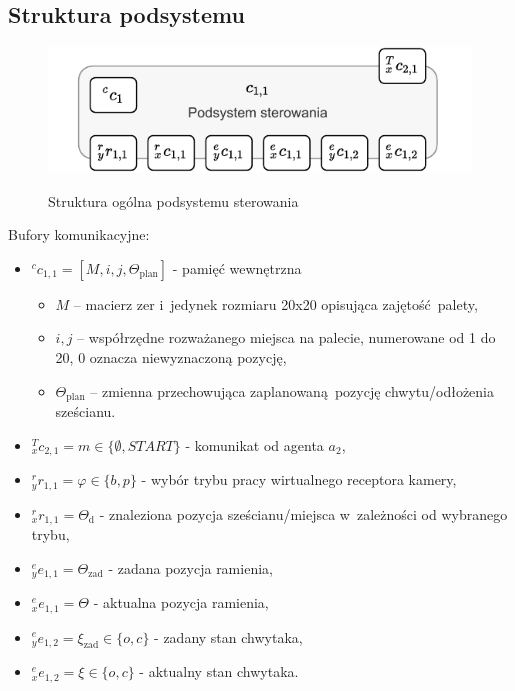 \subsection{Struktura podsystemu}
\label{subsec:cs-struktura}

\begin{figure}[H]
    \centering
    \includegraphics[width=\columnwidth]{figures/ISR-cs-model.pdf}
    \label{fig:model-cs}
    \caption{Struktura ogólna podsystemu sterowania}
\end{figure}

Bufory komunikacyjne:
\begin{itemize}
    \item ${}^{c}c_{1,1} = [M, i, j, \Theta_{\mathrm{plan}}]$ - pamięć wewnętrzna \begin{itemize}
        \item $M$ -- macierz zer i~jedynek rozmiaru 20x20 opisująca zajętość palety,
        \item $i,j$ -- współrzędne rozważanego miejsca na palecie, numerowane od 1 do 20, 0 oznacza niewyznaczoną pozycję,
        \item $\Theta_{\mathrm{plan}}$ -- zmienna przechowująca zaplanowaną pozycję chwytu/odłożenia sześcianu.
    \end{itemize}
    
    \item ${}^{T}_{x}c_{2,1} = m \in \{ \emptyset, START \}$ - komunikat od agenta $a_{2}$,
    
    \item ${}^{r}_{y}r_{1,1} = \varphi \in \{b, p\}$ - wybór trybu pracy wirtualnego receptora kamery,
    \item ${}^{r}_{x}r_{1,1} = \Theta_{\mathrm{d}}$ - znaleziona pozycja sześcianu/miejsca w~zależności od wybranego trybu,

    \item ${}^{e}_{y}e_{1,1} = \Theta_{\mathrm{zad}}$ - zadana pozycja ramienia,
    \item ${}^{e}_{x}e_{1,1} = \Theta$ - aktualna pozycja ramienia,

    \item ${}^{e}_{y}e_{1,2} = \xi_{\mathrm{zad}} \in \{o, c\}$ - zadany stan chwytaka,
    \item ${}^{e}_{x}e_{1,2} = \xi \in \{o, c\}$ - aktualny stan chwytaka.
\end{itemize}

